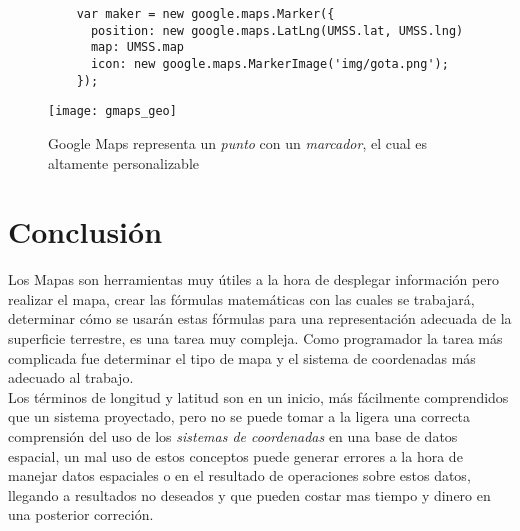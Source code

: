     \begin{figure}[!htp]
    \label{fig:gmaps_geo}
  \begin{verbatim}
    var maker = new google.maps.Marker({
      position: new google.maps.LatLng(UMSS.lat, UMSS.lng)
      map: UMSS.map
      icon: new google.maps.MarkerImage('img/gota.png');
    });
  \end{verbatim}

          \begin{center}
            \texttt{[image: gmaps\_geo]}
          \end{center}
          \caption[Google Maps - Marker]{Google Maps representa un \emph{punto} con un \emph{marcador}, el cual es altamente personalizable } 
    \end{figure}









  \section{Conclusi\'on} %
  \label{sec:geo_conclusion}
    Los Mapas son herramientas muy útiles a la hora de desplegar información pero realizar el mapa, crear las fórmulas matemáticas con las cuales se trabajará, determinar cómo se usarán estas fórmulas para una representación adecuada de la superficie terrestre, es una tarea muy compleja. Como programador la tarea más complicada fue determinar el tipo de mapa y el sistema de coordenadas más adecuado al trabajo.\\

    Los términos de longitud y latitud son en un inicio, más fácilmente comprendidos que un sistema proyectado, pero no se puede tomar a la ligera una correcta comprensión del uso de los \emph{sistemas de coordenadas} en una base de datos espacial, un mal uso de estos conceptos puede generar errores a la hora de manejar datos  espaciales o en el resultado de operaciones sobre estos  datos, llegando a resultados no deseados y que pueden costar mas tiempo y dinero en una posterior correci\'on.\\

